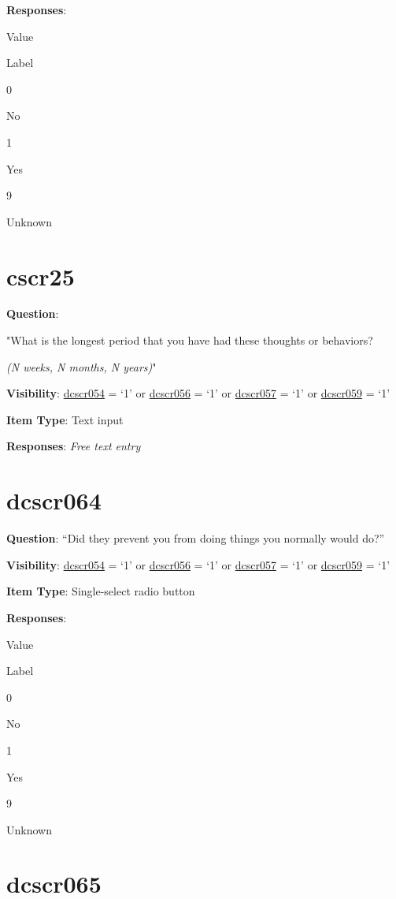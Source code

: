 \documentclass[]{book}
\begin{document}
\textbf{Responses}:

Value

Label

0

No

1

Yes

9

Unknown

\hypertarget{cscr25}{%
\section{cscr25}\label{cscr25}}

\textbf{Question}:

"What is the longest period that you have had these thoughts or behaviors?

\emph{(N weeks, N months, N years)}"

\textbf{Visibility}: \protect\hyperlink{dcscr054}{dcscr054} = `1' or \protect\hyperlink{dcscr056}{dcscr056} = `1' or \protect\hyperlink{dcscr057}{dcscr057} = `1' or \protect\hyperlink{dcscr059}{dcscr059} = `1'

\textbf{Item Type}: Text input

\textbf{Responses}: \emph{Free text entry}

\hypertarget{dcscr064}{%
\section{dcscr064}\label{dcscr064}}

\textbf{Question}: ``Did they prevent you from doing things you normally would do?''

\textbf{Visibility}: \protect\hyperlink{dcscr054}{dcscr054} = `1' or \protect\hyperlink{dcscr056}{dcscr056} = `1' or \protect\hyperlink{dcscr057}{dcscr057} = `1' or \protect\hyperlink{dcscr059}{dcscr059} = `1'

\textbf{Item Type}: Single-select radio button

\textbf{Responses}:

Value

Label

0

No

1

Yes

9

Unknown

\hypertarget{dcscr065}{%
\section{dcscr065}\label{dcscr065}}
\end{document}
